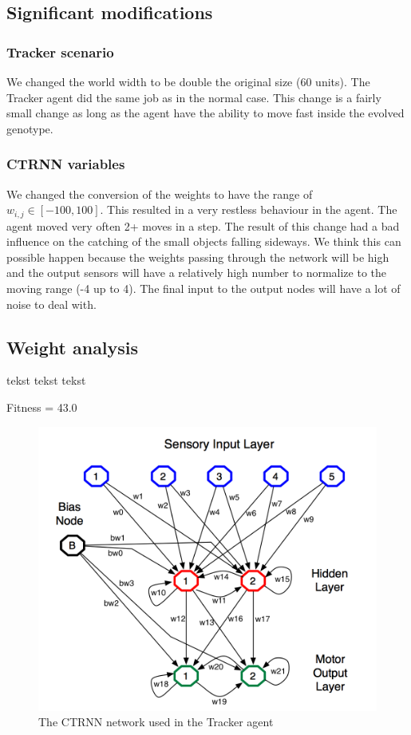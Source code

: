 \subsection{Significant modifications}
\subsubsection{Tracker scenario}
We changed the world width to be double the original size (60 units). The Tracker agent did the same job as in the normal case. This change is a fairly small change as long as the agent have the ability to move fast inside the evolved genotype. 

\subsubsection{CTRNN variables}
We changed the conversion of the weights to have the range of $w_{i,j} \in [-100, 100]$. This resulted in a very restless behaviour in the agent. The agent moved very often 2+ moves in a step. The result of this change had a bad influence on the catching of the small objects falling sideways. We think this can possible happen because the weights passing through the network will be high and the output sensors will have a relatively high number to normalize to the moving range (-4 up to 4). The final input to the output nodes will have a lot of noise to deal with. 


\subsection{Weight analysis}
tekst tekst tekst


Fitness = 43.0
\begin{figure}[h]
  \centering
    \includegraphics[width=1.0\textwidth]{img/CTRNN}
    \caption{The CTRNN network used in the Tracker agent}
\end{figure}

